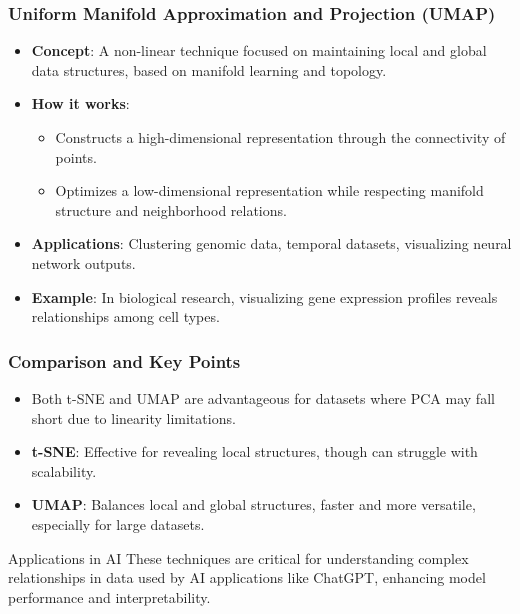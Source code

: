 \documentclass[aspectratio=169]{beamer}
\begin{document}
\begin{frame}[fragile]
    \frametitle{Uniform Manifold Approximation and Projection (UMAP)}
    \begin{itemize}
        \item \textbf{Concept}: A non-linear technique focused on maintaining local and global data structures, based on manifold learning and topology.
        
        \item \textbf{How it works}:
        \begin{itemize}
            \item Constructs a high-dimensional representation through the connectivity of points.
            \item Optimizes a low-dimensional representation while respecting manifold structure and neighborhood relations.
        \end{itemize}
        
        \item \textbf{Applications}: Clustering genomic data, temporal datasets, visualizing neural network outputs.
        
        \item \textbf{Example}: In biological research, visualizing gene expression profiles reveals relationships among cell types.
    \end{itemize}
\end{frame}

\begin{frame}[fragile]
    \frametitle{Comparison and Key Points}
    \begin{itemize}
        \item Both t-SNE and UMAP are advantageous for datasets where PCA may fall short due to linearity limitations.
        \item \textbf{t-SNE}: Effective for revealing local structures, though can struggle with scalability.
        \item \textbf{UMAP}: Balances local and global structures, faster and more versatile, especially for large datasets.
    \end{itemize}

    \begin{block}{Applications in AI}
        These techniques are critical for understanding complex relationships in data used by AI applications like ChatGPT, enhancing model performance and interpretability.
    \end{block}
\end{frame}
\end{document}

